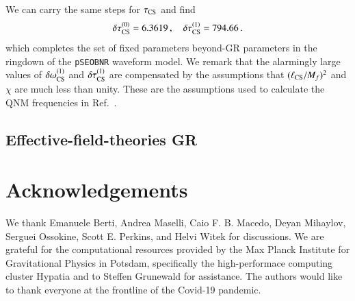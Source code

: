 \documentclass[twocolumn,
               prd,
               aps,
               superscriptaddress,
               tightenlines,
               nofootinbib,
               eqsecnum,
               amsfonts,
               amsmath,
               longbibliography]{revtex4-1}
\newcommand{\pSEOB}{\texttt{pSEOBNR}}
\begin{document}
We can carry the same steps for $\tau_{\rm CS}$ and find
%
\begin{equation}
\delta \tau^{(0)}_{\rm CS} = 6.3619\,, \quad \delta \tau^{(1)}_{\rm CS} = 794.66\,.
\label{eq:cs_tau_coefs}
\end{equation}
%
which completes the set of fixed parameters beyond-GR parameters in the ringdown of the \pSEOB{} waveform model.
%
We remark that the alarmingly large values of $\delta \omega_{\rm CS}^{(1)}$ and $\delta \tau_{\rm CS}^{(1)}$
are compensated by the assumptions that $(\ell_{\rm CS} / M_f)^2$ and $\chi$ are much less than unity. These
are the assumptions used to calculate the QNM frequencies in Ref.~\cite{Wagle:2021tam}.

\subsection{Effective-field-theories GR}
\label{app:map_eftofgr}



\section*{Acknowledgements}
\label{sec:acknowledgements}
%
We thank Emanuele Berti, Andrea Maselli, Caio F. B. Macedo, Deyan Mihaylov,
Serguei Ossokine, Scott E. Perkins, and Helvi Witek for discussions.
%
We are grateful for the computational resources provided by the Max Planck
Institute for Gravitational Physics in Potsdam, specifically the
high-performace computing cluster Hypatia and to Steffen Grunewald for
assistance.
%
The authors would like to thank everyone at the frontline of the Covid-19
pandemic.

% 

\end{document}
